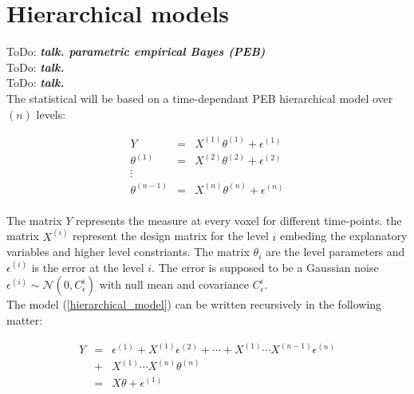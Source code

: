 \documentclass[final, paper=letter,5p,times,twocolumn]{elsarticle}
\newcommand{\ToDo}[1]{ToDo: \textbf{\textit{#1}}}
\theoremstyle{definition}
\begin{document}
\section{Hierarchical models}

\ToDo{talk. parametric empirical Bayes (PEB)} \\
\ToDo{talk. } \\
\ToDo{talk. } \\

The statistical will be based on a time-dependant PEB hierarchical model over $(n)$ levels:

\begin{equation}
  \left .
  \begin{array}{rcl}
    Y & = & X^{(1)} \theta^{(1)} + \epsilon^{(1)} \\
    \theta^{(1)}& = & X^{(2)} \theta^{(2)} + \epsilon^{(2)} \\
    \vdots && \\
    \theta^{(n-1)}& = & X^{(n)} \theta^{(n)} + \epsilon^{(n)} \\
  \end{array}
  \right .
  \label{hierarchical_model}
\end{equation}

The matrix $Y$ represents the measure at every voxel for different time-points. the matrix $X^{(i)}$ represent the design matrix for the level $i$ embeding the explanatory variables and higher level constriants. The matrix $\theta_{i}$ are the level parameters and $\epsilon^{(i)}$ is the error at the level $i$. The error is supposed to be a Gaussian noise $\epsilon^{(i)} \sim \mathcal{N}(0,C_{\epsilon}^{i})$ with null mean and covariance $C_{\epsilon}^{i}$.\\
The model (\ref{hierarchical_model}) can be written recursively in the following matter:

\begin{equation}
  \left .
  \begin{array}{rcl}
    Y & = & \epsilon^{(1)} +  X^{(1)} \epsilon^{(2)} + \cdots + X^{(1)} \cdots X^{(n-1)} \epsilon^{(n)}   \\
    & + & X^{(1)} \cdots X^{(n)} \theta^{(n)}\\
    & = & X\theta + \epsilon^{(1)} 
  \end{array}
  \right .
  \label{hierarchical_model_recursive}
\end{equation}
\end{document}
